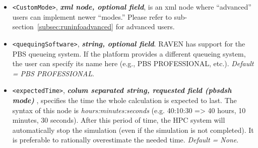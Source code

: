 \begin{itemize}
\item \texttt{<CustomMode>}, \textbf{\textit{xml node, optional field}}, is an
xml node where ``advanced'' users can implement newer ``modes.''
%
Please refer to sub-section~\ref{subsec:runinfoadvanced} for advanced users.

\item \texttt{<quequingSoftware>}, \textbf{\textit{string, optional field}}.
RAVEN has support for the PBS queueing system. If the platform provides a
different queueing system, the user can specify its name here (e.g., PBS
PROFESSIONAL, etc.).
%
\textit{Default = PBS PROFESSIONAL}.

\item \texttt{<expectedTime>}, \textbf{\textit{colum separated string, requested
field (pbsdsh mode) }}, specifies the time the whole calculation is expected to
last.
%
The syntax of this node is \textit{hours:minutes:seconds} (e.g. 40:10:30 => 40
hours, 10 minutes, 30 seconds). After this period of time, the HPC system will
automatically stop the simulation (even if the simulation is not completed). It
is preferable to rationally overestimate the needed time.
%
\textit{Default = None}.
\end{itemize}

